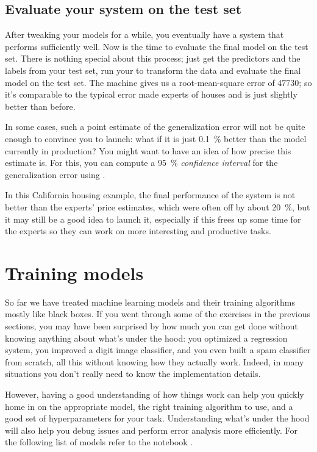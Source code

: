 \subsection{Evaluate your system on the test set}
After tweaking your models for a while, you eventually have a system that performs sufficiently well. Now is the time to evaluate the final model on the test set. There is nothing special about this process; just get the predictors and the labels from your test set, run your  to transform the data and evaluate the final model on the test set. The machine gives us a root-mean-square error of \num{47730}; so it's comparable to the typical error made experts of houses and is just slightly better than before.

In some cases, such a point estimate of the generalization error will not be quite enough to convince you to launch: what if it is just \SI{0.1}{\percent} better than the model currently in production? You might want to have an idea of how precise this estimate is. For this, you can compute a \SI{95}{\percent} \emph{confidence interval} for the generalization error using .

In this California housing example, the final performance of the system is not better than the experts' price estimates, which were often off by about \SI{20}{\percent}, but it may still be a good idea to launch it, especially if this frees up some time for the experts so they can work on more interesting and productive tasks.
\section{Training models}
So far we have treated machine learning models and their training algorithms mostly like black boxes. If you went through some of the exercises in the previous sections, you may have been surprised by how much you can get done without knowing anything about what's under the hood: you optimized a regression system, you improved a digit image classifier, and you even built a spam classifier from scratch, all this without knowing how they actually work. Indeed, in many situations you don't really need to know the implementation details.

However, having a good understanding of how things work can help you quickly home in on the appropriate model, the right training algorithm to use, and a good set of hyperparameters for your task. Understanding what's under the hood will also help you debug issues and perform error analysis more efficiently. For the following list of models refer to the notebook .
